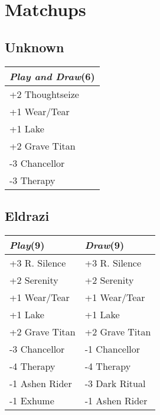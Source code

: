 \documentclass{article}
\renewcommand *\contentsname{Contents}
\begin{document}
\section*{Matchups}
\begin{multicols}{2}
\subsection*{Unknown}
\begin{center}
\begin{tabular}{| l |}
\hline
\textit{Play and Draw}(6) \\
\hline
\cellcolor[HTML]{BBDDBB}\small{+2 Thoughtseize}\\
\cellcolor[HTML]{BBDDBB}\small{+1 Wear/Tear}\\
\cellcolor[HTML]{BBDDBB}\small{+1 Lake}\\
\cellcolor[HTML]{BBDDBB}\small{+2 Grave Titan}\\
\cellcolor[HTML]{DDBBBB}\small{-3 Chancellor}\\
\cellcolor[HTML]{DDBBBB}\small{-3 Therapy}\\
\hline
\end{tabular}
\end{center}
\subsection*{Eldrazi}
\begin{center}
\begin{tabular}{| l | l |}
\hline
\textit{Play}(9) & \textit{Draw}(9) \\
\hline
\cellcolor[HTML]{BBDDBB}\small{+3 R. Silence} & \cellcolor[HTML]{BBDDBB}\small{+3 R. Silence}\\
\cellcolor[HTML]{BBDDBB}\small{+2 Serenity} & \cellcolor[HTML]{BBDDBB}\small{+2 Serenity}\\
\cellcolor[HTML]{BBDDBB}\small{+1 Wear/Tear} & \cellcolor[HTML]{BBDDBB}\small{+1 Wear/Tear}\\
\cellcolor[HTML]{BBDDBB}\small{+1 Lake} & \cellcolor[HTML]{BBDDBB}\small{+1 Lake}\\
\cellcolor[HTML]{BBDDBB}\small{+2 Grave Titan} & \cellcolor[HTML]{BBDDBB}\small{+2 Grave Titan}\\
\cellcolor[HTML]{DDBBBB}\small{-3 Chancellor} & \cellcolor[HTML]{DDBBBB}\small{-1 Chancellor}\\
\cellcolor[HTML]{DDBBBB}\small{-4 Therapy} & \cellcolor[HTML]{DDBBBB}\small{-4 Therapy}\\
\cellcolor[HTML]{DDBBBB}\small{-1 Ashen Rider} & \cellcolor[HTML]{DDBBBB}\small{-3 Dark Ritual}\\
\cellcolor[HTML]{DDBBBB}\small{-1 Exhume} & \cellcolor[HTML]{DDBBBB}\small{-1 Ashen Rider}\\
\hline
\end{tabular}
\end{center}

\end{multicols}
\end{document}
